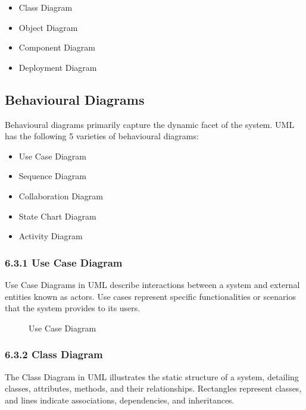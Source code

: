 \documentclass[12pt,a4paper,oneside]{report}
\numberwithin{figure}{chapter}
\numberwithin{table}{chapter}
\begin{document}
\begin{itemize}[leftmargin=2em]
  \item Class Diagram
  \item Object Diagram
  \item Component Diagram
  \item Deployment Diagram
\end{itemize}

\subsection{Behavioural Diagrams}

Behavioural diagrams primarily capture the dynamic facet of the system. UML has the
following 5 varieties of behavioural diagrams:

\begin{itemize}[leftmargin=2em]
  \item Use Case Diagram
  \item Sequence Diagram
  \item Collaboration Diagram
  \item State Chart Diagram
  \item Activity Diagram
\end{itemize}

\subsubsection{6.3.1 Use Case Diagram}

Use Case Diagrams in UML describe interactions between a system and external entities
known as actors. Use cases represent specific functionalities or scenarios that the
system provides to its users.

\begin{figure}[H]
  \centering
  \caption{Use Case Diagram}
  \label{fig:usecase}
\end{figure}

\subsubsection{6.3.2 Class Diagram}

The Class Diagram in UML illustrates the static structure of a system, detailing classes,
attributes, methods, and their relationships. Rectangles represent classes, and lines
indicate associations, dependencies, and inheritances.
\end{document}
